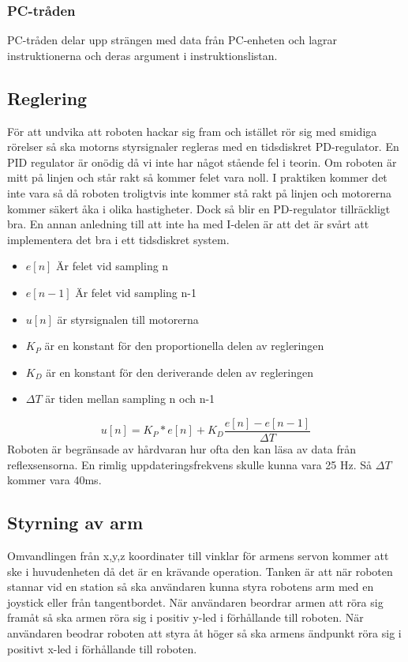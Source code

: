 \subsubsection{PC-tråden}
PC-tråden delar upp strängen med data från PC-enheten och lagrar instruktionerna och deras argument i instruktionslistan.

\subsection{Reglering}
För att undvika att roboten hackar sig fram och istället rör sig med smidiga rörelser så ska motorns styrsignaler regleras med en tidsdiskret PD-regulator. En PID regulator är onödig då vi inte har något stående fel i teorin. Om roboten är mitt på linjen och står rakt så kommer felet vara noll. I praktiken kommer det inte vara så då roboten troligtvis inte kommer stå rakt på linjen och motorerna kommer säkert åka i olika hastigheter. Dock så blir en PD-regulator tillräckligt bra. En annan anledning till att inte ha med I-delen är att det är svårt att implementera det bra i ett tidsdiskret system.
\begin{itemize}
\item $e[n]$ Är felet vid sampling n
\item $e[n-1]$ Är felet vid sampling n-1
\item $u[n]$ är styrsignalen till motorerna
\item $K_{P}$ är en konstant för den proportionella delen av regleringen
\item $K_{D}$ är en konstant för den deriverande delen av regleringen
\item $\Delta T$ är tiden mellan sampling n och n-1

\end{itemize}
 $$ u[n] = K_P*e[n] + K_D\frac{e[n]-e[n-1]}{\Delta T}$$
 Roboten är begränsade av hårdvaran hur ofta den kan läsa av data från reflexsensorna. En rimlig uppdateringsfrekvens skulle kunna vara 25 Hz\cite{handledare}. Så $\Delta T$ kommer vara 40ms.

 \subsection{Styrning av arm}
 Omvandlingen från x,y,z koordinater till vinklar för armens servon kommer att ske i huvudenheten då det är en krävande operation. Tanken är att när roboten stannar vid en station så ska användaren kunna styra robotens arm med en joystick eller från tangentbordet. När användaren beordrar armen att röra sig framåt så ska armen röra sig i positiv y-led i förhållande till roboten. När användaren beodrar roboten att styra åt höger så ska armens ändpunkt röra sig i positivt x-led i förhållande till roboten.
 \newline

